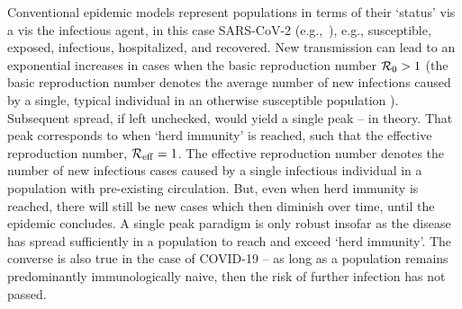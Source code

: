 Conventional epidemic
models represent populations in terms of their `status' vis
a vis the infectious agent, in this case 
SARS-CoV-2 (e.g.,~\citep{ferguson2020report,kucharski2020early,kissler_medrxiv2020,park_medrxiv2020,kraemer_2020sci,li_science2020,wu2020estimating}), e.g.,
susceptible, exposed, infectious,
hospitalized, and recovered.  
New transmission can lead to an exponential increases in cases 
when the basic reproduction number ${\cal{R}}_0>1$ (the
basic reproduction number denotes the average number of new
infections caused by a single, typical individual in an otherwise
susceptible population \citep{anderson1991infectious}).  Subsequent
spread, if left unchecked, would yield a single peak -- in theory. That 
peak corresponds to when `herd immunity' is reached, such
that the effective reproduction number, ${\cal{R}}_{\mathrm{eff}}=1$.
The effective reproduction number denotes the number of new
infectious cases caused by a single infectious individual
in a population with pre-existing circulation.
But, even when herd immunity is reached, there will still be new cases 
which then diminish over time, until the epidemic concludes.  
A single peak paradigm is
only robust insofar as the disease has spread
sufficiently in a population to reach and exceed `herd immunity'.
The converse
is also true in the case of COVID-19 -- as long as 
a population remains predominantly immunologically
naive, then the risk of further infection has not passed. 

